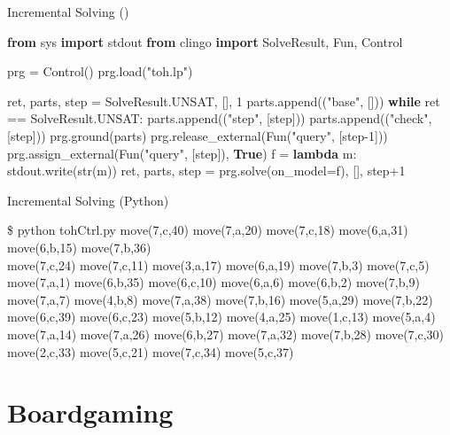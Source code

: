 \begin{frame}[fragile]{Incremental Solving ()}
  \small
  \begin{semiverbatim}
{\bf{}from} sys {\bf{}import} stdout
{\bf{}from} clingo {\bf{}import} SolveResult, Fun, Control

\alert<3>{prg = Control()}
\alert<3>{prg.load("toh.lp")}

ret, parts, step = SolveResult.UNSAT, [], 1
parts.append(("base", []))
{\bf{}while} ret == SolveResult.UNSAT:
    parts.append(("step", [step]))
    parts.append(("check", [step]))
    prg.ground(parts)
    prg.release_external(Fun("query", [step-1]))
    prg.assign_external(Fun("query", [step]), {\bf{}True})
    \alert<4,5>{f = {\bf{}lambda} m: stdout.write(str(m))}
    ret, parts, step = prg.solve(\alert<5>{on_model=f}), [], step+1
  \end{semiverbatim}
\end{frame}
\begin{frame}[fragile]{Incremental Solving (Python)}
\scriptsize
\begin{semiverbatim}
\$ python tohCtrl.py \pause
move(7,c,40) move(7,a,20) move(7,c,18) move(6,a,31) move(6,b,15) move(7,b,36) \\
move(7,c,24) move(7,c,11) move(3,a,17) move(6,a,19) move(7,b,3)  move(7,c,5)  \\
move(7,a,1)  move(6,b,35) move(6,c,10) move(6,a,6)  move(6,b,2)  move(7,b,9)  \\
move(7,a,7)  move(4,b,8)  move(7,a,38) move(7,b,16) move(5,a,29) move(7,b,22) \\
move(6,c,39) move(6,c,23) move(5,b,12) move(4,a,25) move(1,c,13) move(5,a,4)  \\
move(7,a,14) move(7,a,26) move(6,b,27) move(7,a,32) move(7,b,28) move(7,c,30) \\
move(2,c,33) move(5,c,21) move(7,c,34) move(5,c,37)
\end{semiverbatim}
\end{frame}
\section{Boardgaming}

